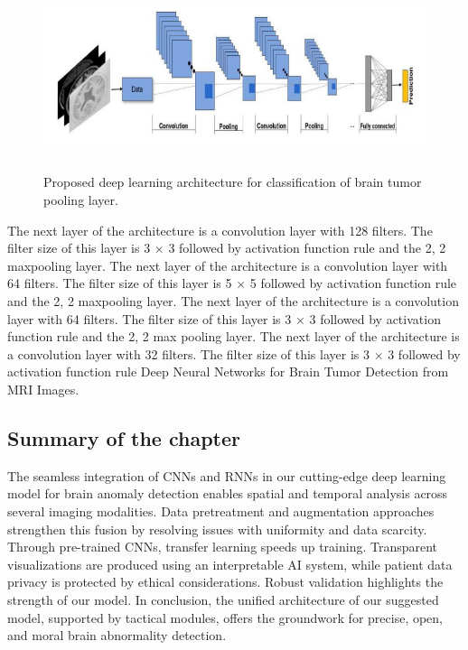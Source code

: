 \begin{figure}[h!]
    \centering
    \includegraphics[height=5.5cm]{img/pollingleayer.jpeg}
    \caption{Proposed deep learning architecture for classification of brain tumor pooling layer.}
    \label{fig:pooling}
\end{figure}  \vspace{5mm} \newpage
The next layer of the architecture is a convolution layer with 128 filters. The filter size of this layer is 3 × 3 followed by activation function rule and the 2, 2 maxpooling layer. The next layer of the architecture is a convolution layer with 64 filters. The filter size of this layer is 5 × 5 followed by activation function rule and the 2, 2 maxpooling layer. The next layer of the architecture is a convolution layer with 64 filters. The filter size of this layer is 3 × 3 followed by activation function rule and the 2, 2 max pooling layer. The next layer of the architecture is a convolution layer with 32 filters. The filter size of this layer is 3 × 3 followed by activation function rule Deep Neural Networks for Brain Tumor Detection from MRI Images.

\newpage
\subsection{Summary of the chapter}
The seamless integration of CNNs and RNNs in our cutting-edge deep learning model for brain anomaly detection enables spatial and temporal analysis across several imaging modalities. Data pretreatment and augmentation approaches strengthen this fusion by resolving issues with uniformity and data scarcity. Through pre-trained CNNs, transfer learning speeds up training. Transparent visualizations are produced using an interpretable AI system, while patient data privacy is protected by ethical considerations. Robust validation highlights the strength of our model. In conclusion, the unified architecture of our suggested model, supported by tactical modules, offers the groundwork for precise, open, and moral brain abnormality detection.